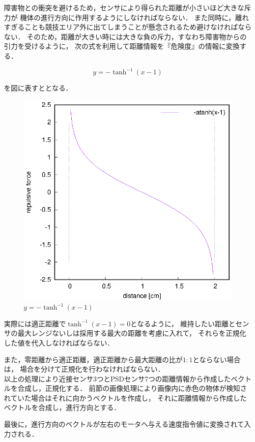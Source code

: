   障害物との衝突を避けるため，センサにより得られた距離が小さいほど大きな斥力が
  機体の進行方向に作用するようにしなければならない．
  また同時に，離れすぎることも競技エリア外に出てしまうことが懸念されるため避けなければならない．
  そのため，距離が大きい時には大きな負の斥力，すなわち障害物からの引力を受けるように，
  次の式を利用して距離情報を『危険度』の情報に変換する．

  \begin{equation}
    y = -\tanh^{-1}(x-1) \label{eq::arctanh}
  \end{equation}

  を図に表すととなる．

  \begin{figure}[H]
    \begin{center}
      \includegraphics[width=1.0\hsize]{../yamasa/plot/minus_atanh.eps}
    \end{center}
    \caption{$y=-\tanh^{-1}(x-1)$}
    \label{fig::arctanh}
  \end{figure}

  実際には適正距離で$\tanh^{-1}(x-1) = 0$となるように，
  維持したい距離とセンサの最大レンジないしは採用する最大の距離を考慮に入れて，
  それらを正規化した値を代入しなければならない．

  また，零距離から適正距離，適正距離から最大距離の比が$1:1$とならない場合は，
  場合を分けて正規化を行わなければならない．\\

  以上の処理により近接センサ3つとPSDセンサ7つの距離情報から作成したベクトルを合成し，正規化する．
  前節の画像処理により画像内に赤色の物体が検知されていた場合はそれに向かうベクトルを作成し，
  それに距離情報から作成したベクトルを合成し，進行方向とする．

  最後に，進行方向のベクトルが左右のモータへ与える速度指令値に変換されて入力される．
